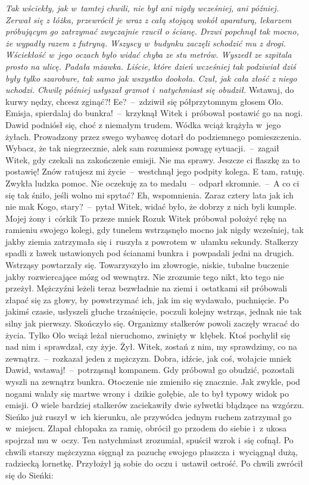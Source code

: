 \documentclass[../MAIN.tex]{subfiles}
\begin{document}
\textsl{Tak wściekły, jak w~tamtej chwili, nie był ani nigdy
wcześniej, ani później. Zerwał się z łóżka, przewrócił je wraz
z całą stojącą wokół aparaturą, lekarzem próbującym go
zatrzymać zwyczajnie rzucił o ścianę. Drzwi popchnął tak mocno,
że wypadły razem z futryną. Wszyscy w~budynku zaczęli schodzić
mu z drogi. Wściekłość w~jego oczach było widać chyba ze stu
metrów. Wyszedł ze szpitala prosto na ulicę. Padała mżawka.
Liście, które dzień wcześniej tak podziwiał dziś były tylko
szarobure, tak samo jak wszystko dookoła. Czuł, jak cała złość z niego uchodzi.
Chwilę później usłyszał grzmot i~natychmiast się obudził.}
%
\sd
\xx Wstawaj, do kurwy nędzy, chcesz zginąć?!
\xx Ee?~--~zdziwił się półprzytomnym głosem Olo.
\xx Emisja, spierdalaj do bunkra!~--~krzyknął Witek i~próbował postawić go na nogi.
\qm
Dawid podniósł się, choć z niemałym trudem. Wódka wciąż krążyła w~jego żyłach. Prowadzony przez swego wybawcę dotarł do podziemnego pomieszczenia.
\sd
\xx Wybacz, że tak niegrzecznie, ale\3k sam rozumiesz powagę sytuacji.~--~zagaił Witek, gdy czekali na zakończenie emisji.
\xx Nie ma sprawy. Jeszcze ci flaszkę za to postawię! Znów ratujesz mi życie~--~westchnął jego podpity kolega.
\xx E tam, ratuję. Zwykła ludzka pomoc. Nie oczekuję za to medalu~--~odparł skromnie.~--~A co ci się tak śniło, jeśli wolno mi spytać?
\xx Eh, wspomnienia. Zaraz cztery lata jak ich nie ma\3k
\xx Kogo, stary?~--~pytał Witek, widać było, że dobrzy z nich byli kumple.
\xx Mojej żony i~córki\3k To przeze mnie\3k
\xx Rozu\3k
\qm
Witek próbował położyć rękę na ramieniu swojego kolegi, gdy tunelem wstrząsnęło mocno jak nigdy wcześniej, tak jakby ziemia zatrzymała się i~ruszyła z powrotem w~ułamku sekundy. Stalkerzy spadli z ławek ustawionych pod ścianami bunkra i~powpadali jedni na drugich. Wstrząsy powtarzały się. Towarzyszyło im złowrogie, niskie, tubalne buczenie jakby rozwiercające mózg od wewnątrz. Nie zrozumie tego nikt, kto tego nie przeżył. Mężczyźni leżeli teraz bezwładnie na ziemi i~ostatkami sił próbowali złapać się za głowy, by powstrzymać ich, jak im się wydawało, puchnięcie. Po jakimś czasie, usłyszeli głuche trzaśnięcie, poczuli kolejny wstrząs, jednak nie tak silny jak pierwszy. Skończyło się. Organizmy stalkerów powoli zaczęły wracać do życia. Tylko Olo wciąż leżał nieruchomo, zwinięty w~kłębek. Ktoś pochylił się nad nim i~sprawdzał, czy żyje. Żył.
\sd
\xx Witek, zostań z nim, my sprawdzimy, co na zewnątrz.~--~rozkazał jeden z mężczyzn.
\xx Dobra, idźcie, jak coś, wołajcie mnie\3k Dawid, wstawaj!~--~potrząsnął kompanem.
\qm
Gdy próbował go obudzić, pozostali wyszli na zewnątrz bunkra. Otoczenie nie zmieniło się znacznie. Jak zwykle, pod nogami walały się martwe wrony i~dzikie gołębie, ale to był typowy widok po emisji. O wiele bardziej stalkerów zaciekawiły dwie sylwetki błądzące na wzgórzu. Sieńko już ruszył w~ich kierunku, ale przywódca jednym ruchem zatrzymał go w~miejscu. Złapał chłopaka za ramię, obrócił go przodem do siebie i~z ukosa spojrzał mu w~oczy. Ten natychmiast zrozumiał, spuścił wzrok i~się cofnął. Po chwili starszy mężczyzna sięgnął za pazuchę swojego płaszcza i~wyciągnął dużą, radziecką lornetkę. Przyłożył ją sobie do oczu i~ustawił ostrość. Po chwili zwrócił się do Sieńki:
\end{document}
